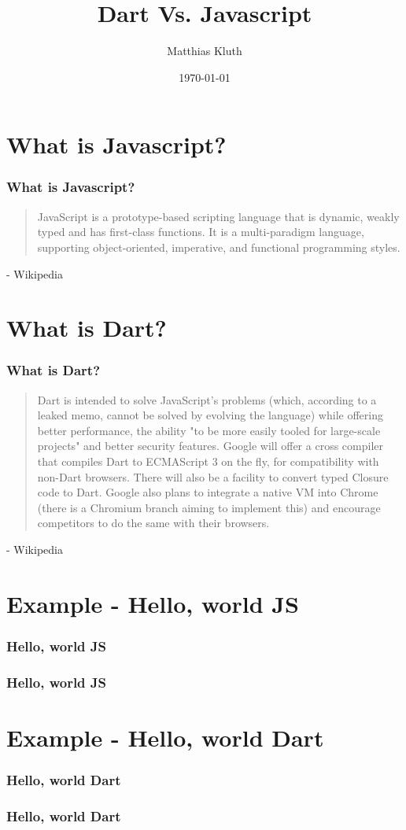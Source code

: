 \documentclass[]{beamer}
\title{Dart Vs. Javascript}
\author{Matthias Kluth}
\date{\today}
\begin{document}
\frame{\titlepage}
\section{What is Javascript?}
\begin{frame}
\frametitle{What is Javascript?}
\begin{quote}
JavaScript is a prototype-based scripting language that is dynamic, weakly typed and has first-class functions. It is a multi-paradigm language, supporting object-oriented, imperative, and functional programming styles.
\end{quote}
- Wikipedia
\end{frame}
\section{What is Dart?}
\begin{frame}
\frametitle{What is Dart?}
\begin{quote}
Dart is intended to solve JavaScript's problems (which, according to a leaked memo, cannot be solved by evolving the language) while offering better performance, the ability "to be more easily tooled for large-scale projects" and better security features. Google will offer a cross compiler that compiles Dart to ECMAScript 3 on the fly, for compatibility with non-Dart browsers. There will also be a facility to convert typed Closure code to Dart. Google also plans to integrate a native VM into Chrome (there is a Chromium branch aiming to implement this) and encourage competitors to do the same with their browsers.
\end{quote}
- Wikipedia
\end{frame}
\section{Example - Hello, world JS}
\begin{frame}
\frametitle{Hello, world JS}

\end{frame}
\begin{frame}
\frametitle{Hello, world JS}

\end{frame}
\section{Example - Hello, world Dart}
\begin{frame}
\frametitle{Hello, world Dart}

\end{frame}
\begin{frame}
\frametitle{Hello, world Dart}

\end{frame}
\end{document}
